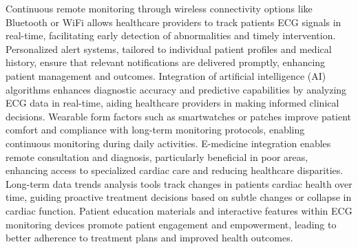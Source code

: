 Continuous remote monitoring through wireless connectivity options like Bluetooth or WiFi allows healthcare providers to track patients ECG signals in real-time, facilitating early detection of abnormalities and timely intervention. Personalized alert systems, tailored to individual patient profiles and medical history, ensure that relevant notifications are delivered promptly, enhancing patient management and outcomes. Integration of artificial intelligence (AI) algorithms enhances diagnostic accuracy and predictive capabilities by analyzing ECG data in real-time, aiding healthcare providers in making informed clinical decisions. Wearable form factors such as smartwatches or patches improve patient comfort and compliance with long-term monitoring protocols, enabling continuous monitoring during daily activities. E-medicine integration enables remote consultation and diagnosis, particularly beneficial in poor areas, enhancing access to specialized cardiac care and reducing healthcare disparities. Long-term data trends analysis tools track changes in patients cardiac health over time, guiding proactive treatment decisions based on subtle changes or collapse in cardiac function. Patient education materials and interactive features within ECG monitoring devices promote patient engagement and empowerment, leading to better adherence to treatment plans and improved health outcomes.
\pagebreak
